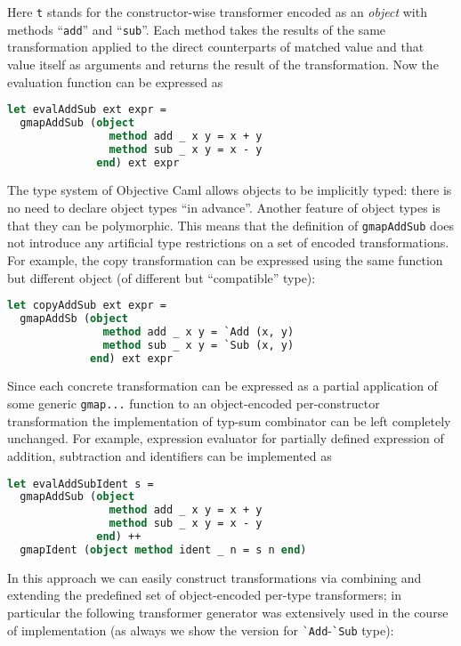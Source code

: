Here \lstinline{t} stands for the constructor-wise transformer encoded
as an \emph{object} with methods ``\lstinline{add}'' and ``\lstinline{sub}''.
Each method takes the results of the same transformation applied to the
direct counterparts of matched value and that value itself as arguments
and returns the result of the transformation. Now the evaluation function
can be expressed as

\begin{lstlisting}[language=ocaml]
let evalAddSub ext expr = 
  gmapAddSub (object
                method add _ x y = x + y
                method sub _ x y = x - y
              end) ext expr
\end{lstlisting}

The type system of Objective Caml allows objects to be implicitly typed: there is 
no need to declare object types ``in advance''. Another feature of object
types is that they can be polymorphic. This means that the definition of
\lstinline{gmapAddSub} does not introduce any artificial type restrictions
on a set of encoded transformations. For example, the copy transformation
can be expressed using the same function but different object (of different but
``compatible'' type):

\begin{lstlisting}[language=ocaml]
let copyAddSub ext expr =
  gmapAddSb (object
               method add _ x y = `Add (x, y)
               method sub _ x y = `Sub (x, y)
             end) ext expr
\end{lstlisting}

Since each concrete transformation can be expressed as a partial application of
some generic \lstinline{gmap...} function to an object-encoded per-constructor
transformation the implementation of typ-sum combinator can be left completely 
unchanged. For example, expression evaluator for partially defined expression
of addition, subtraction and identifiers can be implemented as

\begin{lstlisting}[language=ocaml]
let evalAddSubIdent s = 
  gmapAddSub (object
                method add _ x y = x + y
                method sub _ x y = x - y
              end) ++
  gmapIdent (object method ident _ n = s n end)
\end{lstlisting}

In this approach we can easily construct transformations via combining and
extending the predefined set of object-encoded per-type transformers; in 
particular the following transformer generator was extensively used in the course
of implementation (as always we show the version for \lstinline{`Add}-\lstinline{`Sub}
type):

